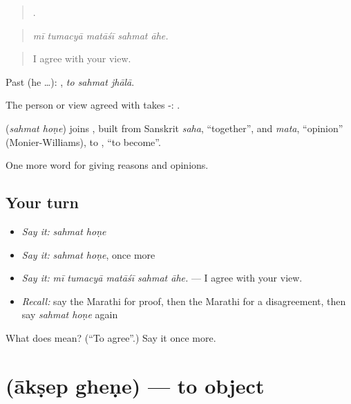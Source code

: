 \begin{quote}
    .
\end{quote}

\begin{quote}
\emph{mī tumacyā matāśī sahmat āhe.}
\end{quote}

\begin{quote}
I agree with your view.
\end{quote}

Past (he …):   , \emph{to sahmat jhālā}.

The person or view agreed with takes -:  .

\begin{cousinweb}
\textbf{ } (\emph{sahmat hoṇe}) joins , built from Sanskrit \emph{saha}, \textquotedblleft{}together\textquotedblright{}, and \emph{mata}, \textquotedblleft{}opinion\textquotedblright{} (Monier-Williams), to , \textquotedblleft{}to become\textquotedblright{}.
\end{cousinweb}

\begin{grammarlens}[title={What you've built}]
One more word for giving reasons and opinions.
\end{grammarlens}

\subsection*{Your turn}
\begin{itemize}
\raggedright
  \item \emph{Say it:} \emph{sahmat hoṇe}
  \item \emph{Say it:} \emph{sahmat hoṇe}, once more
  \item \emph{Say it:} \emph{mī tumacyā matāśī sahmat āhe.} — I agree with your view.
  \item \emph{Recall:} say the Marathi for proof, then the Marathi for a disagreement, then say \emph{sahmat hoṇe} again
\end{itemize}

\begin{tcolorbox}[breakable,colback=teal!4,colframe=teal!35!black,title={Before you move on}]
What does   mean? (\textquotedblleft{}To agree\textquotedblright{}.) Say it once more.
\end{tcolorbox}
\section[\texorpdfstring{\mr{आक्षेप} \mr{घेणे} (ākṣep gheṇe)}{आक्षेप घेणे (ākṣep gheṇe)}]{  (ākṣep gheṇe) — to object}

